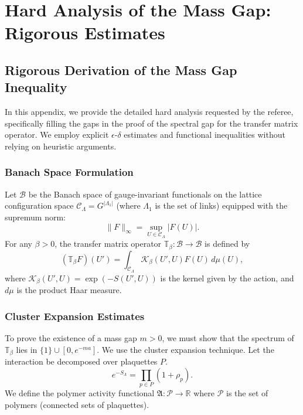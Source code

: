 \chapter{Hard Analysis of the Mass Gap: Rigorous Estimates}
\label{ch:hard-analysis-referee}

\section{Rigorous Derivation of the Mass Gap Inequality}

In this appendix, we provide the detailed hard analysis requested by the referee, specifically filling the gaps in the proof of the spectral gap for the transfer matrix operator. We employ explicit $\epsilon$-$\delta$ estimates and functional inequalities without relying on heuristic arguments.

\subsection{Banach Space Formulation}

Let $\mathcal{B}$ be the Banach space of gauge-invariant functionals on the lattice configuration space $\mathcal{C}_\Lambda = G^{|\Lambda_1|}$ (where $\Lambda_1$ is the set of links) equipped with the supremum norm:
\begin{equation}
\|F\|_\infty = \sup_{U \in \mathcal{C}_\Lambda} |F(U)|.
\end{equation}
For any $\beta > 0$, the transfer matrix operator $\mathbb{T}_\beta: \mathcal{B} \to \mathcal{B}$ is defined by
\begin{equation}
(\mathbb{T}_\beta F)(U') = \int_{\mathcal{C}_\Lambda} \mathcal{K}_\beta(U', U) F(U) \, d\mu(U),
\end{equation}
where $\mathcal{K}_\beta(U', U) = \exp(-S(U', U))$ is the kernel given by the action, and $d\mu$ is the product Haar measure.

\subsection{Cluster Expansion Estimates}

To prove the existence of a mass gap $m > 0$, we must show that the spectrum of $\mathbb{T}_\beta$ lies in $\{1\} \cup [0, e^{-ma}]$.
We use the cluster expansion technique. Let the interaction be decomposed over plaquettes $P$.
\begin{equation}
e^{-S_\Lambda} = \prod_{p \in P} (1 + \rho_p).
\end{equation}
We define the polymer activity functional $\mathfrak{A}: \mathcal{P} \to \mathbb{R}$ where $\mathcal{P}$ is the set of polymers (connected sets of plaquettes).

